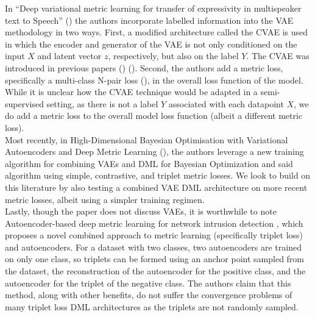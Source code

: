 \documentclass[./dissertation.tex]{subfiles}
\begin{document}
In ``Deep variational metric learning for transfer of expressivity in multispeaker text to Speech'' (\cite{kulkarni2020deep}) the authors incorporate labelled information into the VAE methodology in two ways. First, a modified architecture called the CVAE is used in which the encoder and generator of the VAE is not only conditioned on the input $X$ and latent vector $z$, respectively, but also on the label $Y$. The CVAE was introduced in previous papers (\cite{sohn2015learning}) (\cite{dahmani2019conditional}). Second, the authors add a metric loss, specifically a multi-class N-pair loss (\cite{sohn2016improved}), in the overall loss function of the model. While it is unclear how the CVAE technique would be adapted in a semi-supervised setting, as there is not a label $Y$ associated with each datapoint $X$, we do add a metric loss to the overall model loss function (albeit a different metric loss). \\
    
Most recently, in High-Dimensional Bayesian Optimisation with Variational Autoencoders and Deep Metric Learning (\cite{grosnit2021high}), the authors leverage a new training algorithm for combining VAEs and DML for Bayesian Optimization and said algorithm using simple, contrastive, and triplet metric losses. We look to build on this literature by also testing a combined VAE DML architecture on more recent metric losses, albeit using a simpler training regimen. \\

Lastly, though the paper does not discuss VAEs, it is worthwhile to note Autoencoder-based deep metric learning for network intrusion detection \cite{ANDRESINI2021706}, which proposes a novel combined approach to metric learning (specifically triplet loss) and autoencoders. For a dataset with two classes, two autoencoders are trained on only one class, so triplets can be formed using an anchor point sampled from the dataset, the reconstruction of the autoencoder for the positive class, and the autoencoder for the triplet of the negative class. The authors claim that this method, along with other benefits, do not suffer the convergence problems of many triplet loss DML architectures as the triplets are not randomly sampled.
\end{document}

